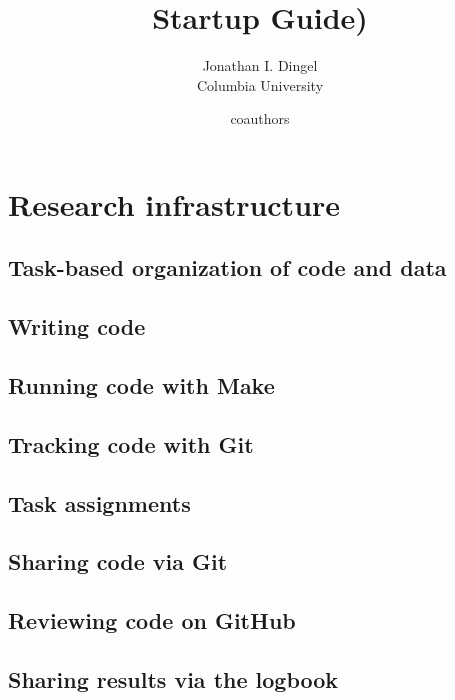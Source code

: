 \documentclass{report}
\title{Startup Guide)}
\author{
Jonathan I. Dingel \\ {Columbia University} \and
coauthors
}
\date{}
\numberwithin{equation}{section}
\numberwithin{figure}{section}
\numberwithin{table}{section}
\begin{document}
\maketitle

\renewcommand{\thechapter}{\Alph{chapter}}
\setcounter{tocdepth}{1}
\tableofcontents
\etocsettocstyle{}{} %

\chapter{Research infrastructure}


\section{Task-based organization of code and data} 
\section{Writing code} 
\section{Running code with Make} 
\section{Tracking code with Git} 

\section{Task assignments} 
\section{Sharing code via Git} 
\section{Reviewing code on GitHub} 
\section{Sharing results via the logbook} 
\end{document}
